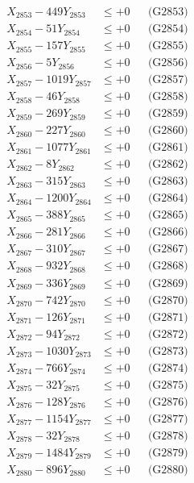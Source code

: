 \documentclass[a4paper,10pt]{article}
\begin{document}
{\begin{align}
X_{2853} - 449Y_{2853} &\leq +0 && \text{(G2853)} \\
X_{2854} - 51Y_{2854} &\leq +0 && \text{(G2854)} \\
X_{2855} - 157Y_{2855} &\leq +0 && \text{(G2855)} \\
X_{2856} - 5Y_{2856} &\leq +0 && \text{(G2856)} \\
X_{2857} - 1019Y_{2857} &\leq +0 && \text{(G2857)} \\
X_{2858} - 46Y_{2858} &\leq +0 && \text{(G2858)} \\
X_{2859} - 269Y_{2859} &\leq +0 && \text{(G2859)} \\
X_{2860} - 227Y_{2860} &\leq +0 && \text{(G2860)} \\
\allowbreak
X_{2861} - 1077Y_{2861} &\leq +0 && \text{(G2861)} \\
X_{2862} - 8Y_{2862} &\leq +0 && \text{(G2862)} \\
X_{2863} - 315Y_{2863} &\leq +0 && \text{(G2863)} \\
X_{2864} - 1200Y_{2864} &\leq +0 && \text{(G2864)} \\
X_{2865} - 388Y_{2865} &\leq +0 && \text{(G2865)} \\
X_{2866} - 281Y_{2866} &\leq +0 && \text{(G2866)} \\
X_{2867} - 310Y_{2867} &\leq +0 && \text{(G2867)} \\
X_{2868} - 932Y_{2868} &\leq +0 && \text{(G2868)} \\
X_{2869} - 336Y_{2869} &\leq +0 && \text{(G2869)} \\
X_{2870} - 742Y_{2870} &\leq +0 && \text{(G2870)} \\
\allowbreak
X_{2871} - 126Y_{2871} &\leq +0 && \text{(G2871)} \\
X_{2872} - 94Y_{2872} &\leq +0 && \text{(G2872)} \\
X_{2873} - 1030Y_{2873} &\leq +0 && \text{(G2873)} \\
X_{2874} - 766Y_{2874} &\leq +0 && \text{(G2874)} \\
X_{2875} - 32Y_{2875} &\leq +0 && \text{(G2875)} \\
X_{2876} - 128Y_{2876} &\leq +0 && \text{(G2876)} \\
X_{2877} - 1154Y_{2877} &\leq +0 && \text{(G2877)} \\
X_{2878} - 32Y_{2878} &\leq +0 && \text{(G2878)} \\
X_{2879} - 1484Y_{2879} &\leq +0 && \text{(G2879)} \\
X_{2880} - 896Y_{2880} &\leq +0 && \text{(G2880)} \\

\end{align}}
\end{document}
